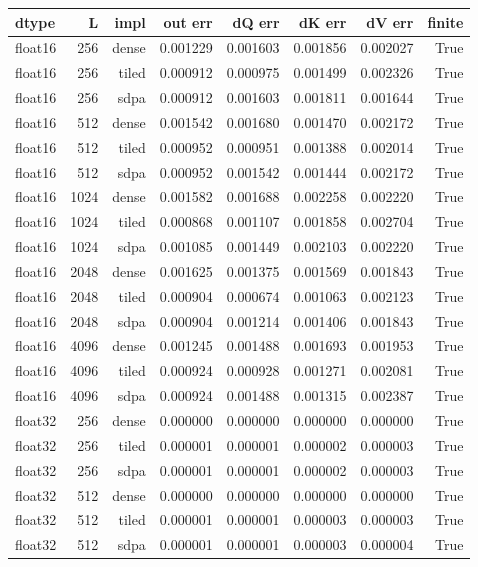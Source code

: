\begin{tabular}{lrrrrrrr}
\toprule
dtype & L & impl & out err & dQ err & dK err & dV err & finite \\
\midrule
float16 & 256 & dense & 0.001229 & 0.001603 & 0.001856 & 0.002027 & True \\
float16 & 256 & tiled & 0.000912 & 0.000975 & 0.001499 & 0.002326 & True \\
float16 & 256 & sdpa & 0.000912 & 0.001603 & 0.001811 & 0.001644 & True \\
float16 & 512 & dense & 0.001542 & 0.001680 & 0.001470 & 0.002172 & True \\
float16 & 512 & tiled & 0.000952 & 0.000951 & 0.001388 & 0.002014 & True \\
float16 & 512 & sdpa & 0.000952 & 0.001542 & 0.001444 & 0.002172 & True \\
float16 & 1024 & dense & 0.001582 & 0.001688 & 0.002258 & 0.002220 & True \\
float16 & 1024 & tiled & 0.000868 & 0.001107 & 0.001858 & 0.002704 & True \\
float16 & 1024 & sdpa & 0.001085 & 0.001449 & 0.002103 & 0.002220 & True \\
float16 & 2048 & dense & 0.001625 & 0.001375 & 0.001569 & 0.001843 & True \\
float16 & 2048 & tiled & 0.000904 & 0.000674 & 0.001063 & 0.002123 & True \\
float16 & 2048 & sdpa & 0.000904 & 0.001214 & 0.001406 & 0.001843 & True \\
float16 & 4096 & dense & 0.001245 & 0.001488 & 0.001693 & 0.001953 & True \\
float16 & 4096 & tiled & 0.000924 & 0.000928 & 0.001271 & 0.002081 & True \\
float16 & 4096 & sdpa & 0.000924 & 0.001488 & 0.001315 & 0.002387 & True \\
float32 & 256 & dense & 0.000000 & 0.000000 & 0.000000 & 0.000000 & True \\
float32 & 256 & tiled & 0.000001 & 0.000001 & 0.000002 & 0.000003 & True \\
float32 & 256 & sdpa & 0.000001 & 0.000001 & 0.000002 & 0.000003 & True \\
float32 & 512 & dense & 0.000000 & 0.000000 & 0.000000 & 0.000000 & True \\
float32 & 512 & tiled & 0.000001 & 0.000001 & 0.000003 & 0.000003 & True \\
float32 & 512 & sdpa & 0.000001 & 0.000001 & 0.000003 & 0.000004 & True \\

\end{tabular}
